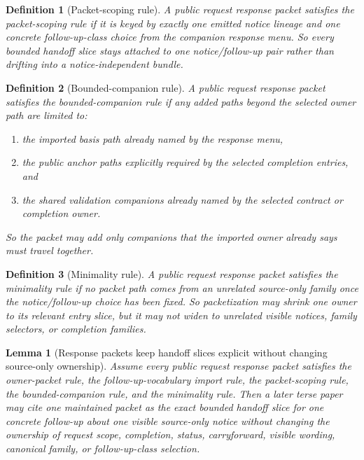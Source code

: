 \documentclass[11pt]{article}
\newtheorem{definition}{Definition}
\newtheorem{lemma}{Lemma}
\begin{document}
\begin{definition}[Packet-scoping rule]
A public request response packet satisfies the \emph{packet-scoping rule} if it is keyed by exactly one emitted notice lineage and one concrete follow-up-class choice from the companion response menu.
So every bounded handoff slice stays attached to one notice/follow-up pair rather than drifting into a notice-independent bundle.
\end{definition}

\begin{definition}[Bounded-companion rule]
A public request response packet satisfies the \emph{bounded-companion rule} if any added paths beyond the selected owner path are limited to:
\begin{enumerate}[leftmargin=*]
\item the imported basis path already named by the response menu,
\item the public anchor paths explicitly required by the selected completion entries, and
\item the shared validation companions already named by the selected contract or completion owner.
\end{enumerate}
So the packet may add only companions that the imported owner already says must travel together.
\end{definition}

\begin{definition}[Minimality rule]
A public request response packet satisfies the \emph{minimality rule} if no packet path comes from an unrelated source-only family once the notice/follow-up choice has been fixed.
So packetization may shrink one owner to its relevant entry slice, but it may not widen to unrelated visible notices, family selectors, or completion families.
\end{definition}

\begin{lemma}[Response packets keep handoff slices explicit without changing source-only ownership]
Assume every public request response packet satisfies the owner-packet rule, the follow-up-vocabulary import rule, the packet-scoping rule, the bounded-companion rule, and the minimality rule.
Then a later terse paper may cite one maintained packet as the exact bounded handoff slice for one concrete follow-up about one visible source-only notice without changing the ownership of request scope, completion, status, carryforward, visible wording, canonical family, or follow-up-class selection.
\end{lemma}
\end{document}
